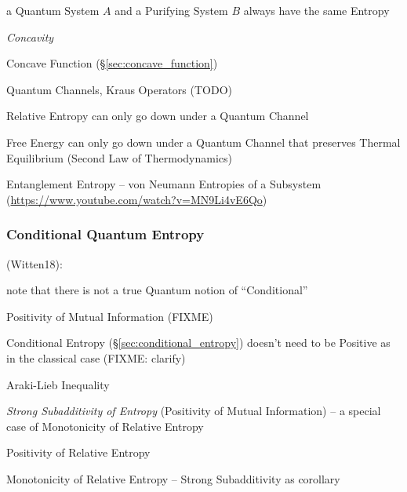 a Quantum System $A$ and a Purifying System $B$ always have the same Entropy

\emph{Concavity}

Concave Function (\S\ref{sec:concave_function})

Quantum Channels, Kraus Operators (TODO)

Relative Entropy can only go down under a Quantum Channel

Free Energy can only go down under a Quantum Channel that preserves Thermal
Equilibrium (Second Law of Thermodynamics)

Entanglement Entropy -- von Neumann Entropies of a Subsystem
(\url{https://www.youtube.com/watch?v=MN9Li4vE6Qo})



\subsubsection{Conditional Quantum Entropy}
\label{sec:conditional_quantum_entropy}

(Witten18):

note that there is not a true Quantum notion of ``Conditional''

Positivity of Mutual Information (FIXME)

Conditional Entropy (\S\ref{sec:conditional_entropy}) doesn't need to be
Positive as in the classical case (FIXME: clarify)

Araki-Lieb Inequality

\emph{Strong Subadditivity of Entropy} (Positivity of Mutual Information) --
a special case of Monotonicity of Relative Entropy

Positivity of Relative Entropy

Monotonicity of Relative Entropy -- Strong Subadditivity as corollary
